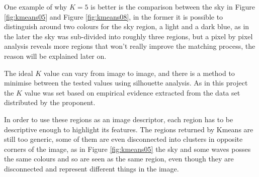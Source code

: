 \documentclass[12pt,a4paper]{article}
\begin{document}
	One example of why $K = 5$ is better is the comparison between the sky in Figure \ref{fig:kmeans05} and Figure \ref{fig:kmeans08}, in the former it is possible to distinguish around two colours for the sky region, a light and a dark blue, as in the later the sky was sub-divided into roughly three regions, but a pixel by pixel analysis reveals more regions that won't really improve the matching process, the reason will be explained later on.
	
	The ideal $K$ value can vary from image to image, and there is a method to minimise between the tested values using silhouette analysis. As in this project the $K$ value was set based on empirical evidence extracted from the data set distributed by the proponent.

	In order to use these regions as an image descriptor, each region has to be descriptive enough to highlight its features. The regions returned by Kmeans are still too generic, some of them are even disconnected into clusters in opposite corners of the image, as in Figure \ref{fig:kmeans05} the sky and some waves posses the same colours and so are seen as the same region, even though they are disconnected and represent different things in the image.

\newpage
\end{document}
